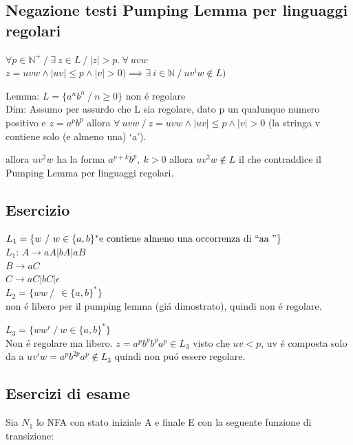 \subsection{Negazione testi Pumping Lemma per linguaggi regolari}
$\forall p \in \mathbb{N}^+ \ / \ \exists\ z \in L \ / \ |z| > p.\ \forall\ uvw $
$z = uvw \land |uv| \leq p \land |v| > 0) \implies \exists\ i \in \mathbb{N} \ / \ u v^i w \not\in L) $

Lemma: $L=\{a^nb^n \ / \ n \geq 0\}$ non \'e regolare\\
Dim: Assumo per assurdo che L sia regolare, dato p un qualunque numero positivo e $z= a^p b^p $ allora
$\forall\ uvw \ / \ z = uvw \land |uv| \leq p \land |v| > 0$ (la stringa v contiene solo (e almeno una) \lq a\rq ).

allora $uv^2w$ ha la forma $a^{p+k}b^p,\ k > 0$
allora $uv^2w \not\in L$ il che contraddice il Pumping Lemma per linguaggi regolari.

\subsection{Esercizio}
$L_1 = \{ w \ / \ w \in \{ a, b \}^* \text{e contiene almeno una occorrenza di \lq\lq aa \rq\rq}\}$\\

$L_1$:
$A \rightarrow aA | bA | aB$\\
$B \rightarrow aC$\\
$C \rightarrow aC | bC | \epsilon $\\

$L_2 = \{ ww \ / \ \ \in \{ a,b \}^* \}$\\
non \'e libero per il pumping lemma (gi\'a dimostrato), quindi non \'e regolare.

$L_3 = \{ww^r \ / \ w \in \{ a,b \}^* \}$\\
Non \'e regolare ma libero.
$z = a^p b^p b^p a^p \in L_3$
visto che $uv < p$, uv \'e composta solo da a 
$u v^i w = a^pb^{2p}a^p \not\in L_3$ quindi non pu\'o essere regolare.

\subsection{Esercizi di esame}
Sia $N_1$ lo NFA con stato iniziale A e finale E con la seguente funzione di transizione:

